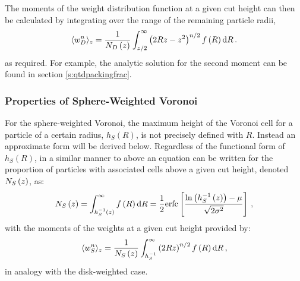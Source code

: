 The moments of the weight distribution function at a given cut height can then be calculated by integrating over the range of the remaining particle radii,
\begin{equation}
	\label{eq:wmom}
	\langle w_D^n \rangle_z = \frac{1}{N_D\left(z\right)}\int_{z/2}^\infty  \left(2Rz-z^2\right)^{n/2} f\left(R\right) \text{d} R\,.
\end{equation}
as required.
For example, the analytic solution for the second moment can be found in section \ref{s:qtdpackingfrac}.

\subsubsection{Properties of Sphere\--Weighted Voronoi}

For the sphere\--weighted Voronoi, the maximum height of the Voronoi cell for a particle of a certain radius, $h_S\left(R\right)$, is not precisely defined with $R$.
Instead an approximate form will be derived below.
Regardless of the functional form of $h_S\left(R\right)$, in a similar manner to above an equation can be written for the proportion of particles with associated cells above a given cut height, denoted $N_S\left(z\right)$, as:
\begin{equation}
	\label{eq:nsz}
	N_S\left(z\right) = \int_{h_{S}^{-1}\left(z\right)}^\infty f\left(R\right) \text{d}R = \frac{1}{2}\text{erfc}\left[\frac{\ln{\left(h_{S}^{-1}\left(z\right)\right)}-\mu}{\sqrt{2\sigma^2}}\right]\,,
\end{equation}
with the moments of the weights at a given cut height provided by:
\begin{equation}
	\label{eq:wns}
	\langle w_S^n \rangle_z = \frac{1}{N_S\left(z\right)}\int_{h_{S}^{-1}}^\infty  \left(2Rz\right)^{n/2} f\left(R\right) \text{d} R\,,
\end{equation}
in analogy with the disk\--weighted case.

